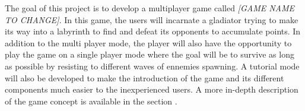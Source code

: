 The goal of this project is to develop a multiplayer game called \textit{[GAME NAME TO CHANGE]}. In this game, the users will incarnate a gladiator trying to make its way into a labyrinth to find and defeat its opponents to accumulate points. In addition to the multi player mode, the player will also have the opportunity to play the game on a single player mode where the goal will be to survive as long as possible by resisting to different waves of ennemies spawning. A tutorial mode will also be developed to make the introduction of the game and its different components much easier to the inexperienced users. A more in-depth description of the game concept is available in the section .
